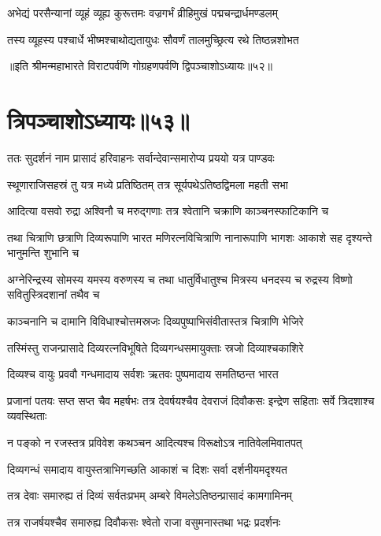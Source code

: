 
\twolineshloka
{अभेद्यं परसैन्यानां व्यूहं व्यूह्य कुरूत्तमः}
{वज्रगर्भं व्रीहिमुखं पद्मचन्द्रार्धमण्डलम्}


\twolineshloka
{तस्य व्यूहस्य पश्चार्धे भीष्मश्चाथोद्यतायुधः}
{सौवर्णं तालमुच्छ्रित्य रथे तिष्ठन्नशोभत}

॥इति श्रीमन्महाभारते विराटपर्वणि गोग्रहणपर्वणि द्विपञ्चाशोऽध्यायः॥५२॥

\chapter{त्रिपञ्चाशोऽध्यायः॥५३॥}

\twolineshloka
{ततः सुदर्शनं नाम प्रासादं हरिवाहनः}
{सर्वान्देवान्समारोप्य प्रययो यत्र पाण्डवः}


\twolineshloka
{स्थूणाराजिसहस्रं तु यत्र मध्ये प्रतिष्ठितम्}
{तत्र सूर्यपथेऽतिष्ठद्विमला महती सभा}


\twolineshloka
{आदित्या वसवो रुद्रा अश्विनौ च मरुद्गणाः}
{तत्र श्वेतानि चक्राणि काञ्चनस्फाटिकानि च}


\threelineshloka
{तथा चित्राणि छत्राणि दिव्यरूपाणि भारत}
{मणिरत्नविचित्राणि नानारूपाणि भागशः}
{आकाशे सह दृश्यन्ते भानुमन्ति शुभानि च}


\threelineshloka
{अग्नेरिन्द्रस्य सोमस्य यमस्य वरुणस्य च}
{तथा धातुर्विधातुश्च मित्रस्य धनदस्य च}
{रुद्रस्य विष्णो सवितुस्त्रिदशानां तथैव च}


\twolineshloka
{काञ्चनानि च दामानि विविधाश्चोत्तमस्रजः}
{दिव्यपुष्पाभिसंवीतास्तत्र चित्राणि भेजिरे}


\twolineshloka
{तस्मिंस्तु राजन्प्रासादे दिव्यरत्नविभूषिते}
{दिव्यगन्धसमायुक्ताः स्रजो दिव्याश्चकाशिरे}


\twolineshloka
{दिव्यश्च वायुः प्रववौ गन्धमादाय सर्वशः}
{ऋतवः पुष्पमादाय समतिष्ठन्त भारत}


\threelineshloka
{प्रजानां पतयः सप्त सप्त चैव महर्षभः}
{तत्र देवर्षयश्चैव देवराजं दिवौकसः}
{इन्द्रेण सहिताः सर्वे त्रिदशाश्च व्यवस्थिताः}


\twolineshloka
{न पङ्को न रजस्तत्र प्रविवेश कथञ्चन}
{आदित्यश्च विरूक्षोऽत्र नातिवेलमिवातपत्}


\twolineshloka
{दिव्यगन्धं समादाय वायुस्तत्राभिगच्छति}
{आकाशं च दिशः सर्वा दर्शनीयमदृश्यत}


\twolineshloka
{तत्र देवाः समारुह्य तं दिव्यं सर्वतःप्रभम्}
{अम्बरे विमलेऽतिष्ठन्प्रासादं कामगामिनम्}


\twolineshloka
{तत्र राजर्षयश्चैव समारुह्य दिवौकसः}
{श्वेतो राजा वसुमनास्तथा भद्रः प्रदर्शनः}


